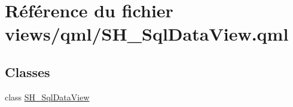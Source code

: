 \hypertarget{SH__SqlDataView_8qml}{\section{Référence du fichier views/qml/\-S\-H\-\_\-\-Sql\-Data\-View.qml}
\label{SH__SqlDataView_8qml}
}
\subsection*{Classes}
\begin{DoxyCompactItemize}
\item 
class \hyperlink{classSH__SqlDataView}{S\-H\-\_\-\-Sql\-Data\-View}
\end{DoxyCompactItemize}

